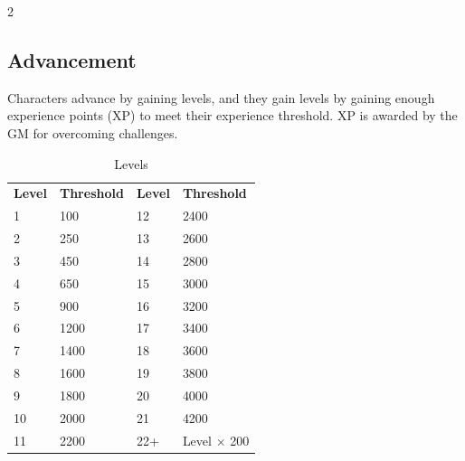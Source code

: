 \begin{multicols}{2}
    \subsection{Advancement}\label{levels}\label{experience points}\label{experience threshold}\label{advancement}
    Characters advance by gaining levels, and they gain levels by gaining enough
    experience points (XP) to meet their experience threshold. XP is awarded
    by the GM for overcoming challenges.
    \begin{table}[ht]
        \unclassedrowcolors
        \begin{tabularx}{\textwidth}{l X l X}
            \textbf{Level} & \textbf{Threshold} & \textbf{Level} & \textbf{Threshold} \\
            1 & 100 & 12 & 2400 \\
            2 & 250 & 13 & 2600 \\
            3 & 450 & 14 & 2800 \\
            4 & 650 & 15 & 3000 \\
            5 & 900 & 16 & 3200 \\
            6 & 1200 & 17 & 3400 \\
            7 & 1400 & 18 & 3600 \\
            8 & 1600 & 19 & 3800 \\
            9 & 1800 & 20 & 4000 \\
            10 & 2000 & 21 & 4200 \\
            11 & 2200 & 22+ & Level $\times$ 200 \\
        \end{tabularx}
        \caption{Levels}
        \label{tab:levels}
    \end{table}


\end{multicols}
